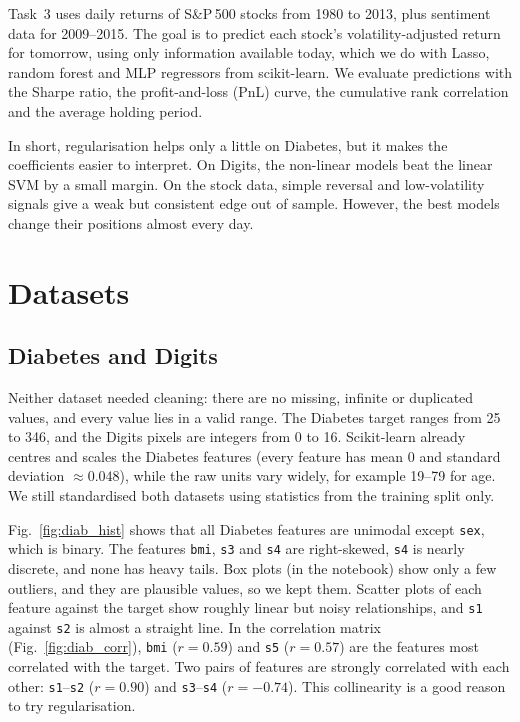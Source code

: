 \documentclass[conference]{IEEEtran}
\begin{document}
Task~3 uses daily returns of S\&P\,500 stocks from 1980 to 2013, plus sentiment data for 2009--2015. The goal is to predict each stock's volatility-adjusted return for tomorrow, using only information available today, which we do with Lasso, random forest and MLP regressors from scikit-learn. We evaluate predictions with the Sharpe ratio, the profit-and-loss (PnL) curve, the cumulative rank correlation and the average holding period.

In short, regularisation helps only a little on Diabetes, but it makes the coefficients easier to interpret. On Digits, the non-linear models beat the linear SVM by a small margin. On the stock data, simple reversal and low-volatility signals give a weak but consistent edge out of sample. However, the best models change their positions almost every day.

\section{Datasets}
\subsection{Diabetes and Digits}
Neither dataset needed cleaning: there are no missing, infinite or duplicated values, and every value lies in a valid range. The Diabetes target ranges from 25 to 346, and the Digits pixels are integers from 0 to 16. Scikit-learn already centres and scales the Diabetes features (every feature has mean 0 and standard deviation $\approx0.048$), while the raw units vary widely, for example 19--79 for age. We still standardised both datasets using statistics from the training split only.

Fig.~\ref{fig:diab_hist} shows that all Diabetes features are unimodal except \texttt{sex}, which is binary. The features \texttt{bmi}, \texttt{s3} and \texttt{s4} are right-skewed, \texttt{s4} is nearly discrete, and none has heavy tails. Box plots (in the notebook) show only a few outliers, and they are plausible values, so we kept them. Scatter plots of each feature against the target show roughly linear but noisy relationships, and \texttt{s1} against \texttt{s2} is almost a straight line. In the correlation matrix (Fig.~\ref{fig:diab_corr}), \texttt{bmi} ($r=0.59$) and \texttt{s5} ($r=0.57$) are the features most correlated with the target. Two pairs of features are strongly correlated with each other: \texttt{s1}--\texttt{s2} ($r=0.90$) and \texttt{s3}--\texttt{s4} ($r=-0.74$). This collinearity is a good reason to try regularisation.
\end{document}
